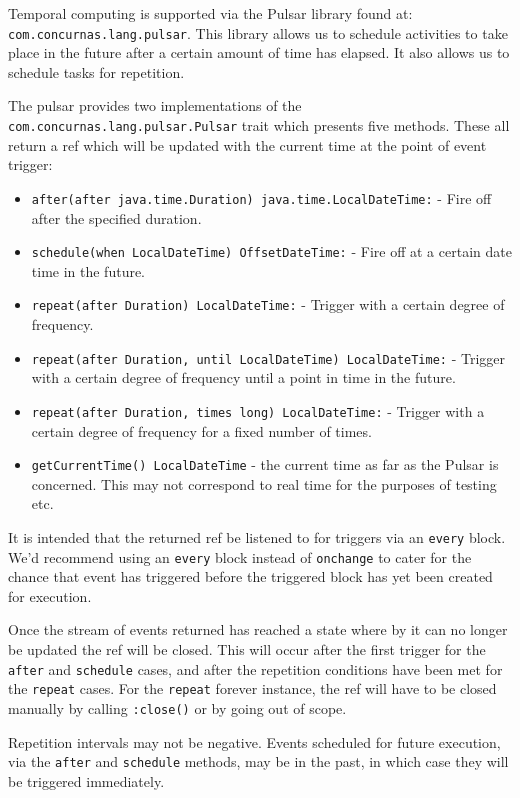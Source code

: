 \documentclass[conc-doc]{subfiles}
\begin{document}
Temporal computing is supported via the Pulsar library found at: \lstinline{com.concurnas.lang.pulsar}. This library allows us to schedule activities to take place in the future after a certain amount of time has elapsed. It also allows us to schedule tasks for repetition.

The pulsar provides two implementations of the \lstinline{com.concurnas.lang.pulsar.Pulsar} trait which presents five methods. These all return a ref which will be updated with the current time at the point of event trigger:

\begin{itemize}
	\item \lstinline{after(after java.time.Duration) java.time.LocalDateTime:} - Fire off after the specified duration.
	\item \lstinline{schedule(when LocalDateTime) OffsetDateTime:} - Fire off at a certain date time in the future.
	\item \lstinline{repeat(after Duration) LocalDateTime:} - Trigger with a certain degree of frequency.
	\item \lstinline{repeat(after Duration, until LocalDateTime) LocalDateTime:} - Trigger with a certain degree of frequency until a point in time in the future.
	\item \lstinline{repeat(after Duration, times long) LocalDateTime:} - Trigger with a certain degree of frequency for a fixed number of times.
	\item \lstinline{getCurrentTime() LocalDateTime} - the current time as far as the Pulsar is concerned. This may not correspond to real time for the purposes of testing etc.
\end{itemize}

It is intended that the returned ref be listened to for triggers via an \lstinline{every} block. We'd recommend using an \lstinline{every} block instead of \lstinline{onchange} to cater for the chance that event has triggered before the triggered block has yet been created for execution.

Once the stream of events returned has reached a state where by it can no longer be updated the ref will be closed. This will occur after the first trigger for the \lstinline{after} and \lstinline{schedule} cases, and after the repetition conditions have been met for the \lstinline{repeat} cases. For the \lstinline{repeat} forever instance, the ref will have to be closed manually by calling \lstinline{:close()} or by going out of scope.

Repetition intervals may not be negative. Events scheduled for future execution, via the \lstinline{after} and \lstinline{schedule} methods, may be in the past, in which case they will be triggered immediately.
\end{document}

